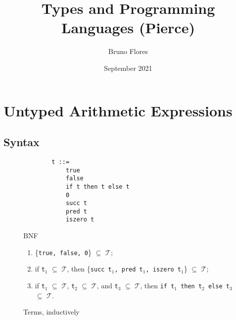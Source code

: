 \documentclass{article}
\title{Types and Programming Languages (Pierce)}
\author{Bruno Flores}
\date{September 2021}
\begin{document}
\maketitle

\section{Untyped Arithmetic Expressions}

\subsection{Syntax}

\begin{figure}[h!]
    \begin{verbatim}
        t ::=
            true
            false
            if t then t else t
            0
            succ t
            pred t
            iszero t
    \end{verbatim}
    \caption{BNF}
\end{figure}

\begin{figure}[h!]
    \begin{enumerate}
        \item \{\texttt{true, false, 0}\} \(\subseteq\) \(\mathcal{T}\);
        \item 
            if \texttt{t\(_1\)} \(\subseteq\) \(\mathcal{T}\), 
            then \{\texttt{succ t\(_1\), pred t\(_1\), iszero t\(_1\)}\} \(\subseteq\) \(\mathcal{T}\);
        \item 
            if \texttt{t\(_1\)} \(\subseteq\) \(\mathcal{T}\), \texttt{t\(_2\)} \(\subseteq\) \(\mathcal{T}\),
            and \texttt{t\(_3\)} \(\subseteq\) \(\mathcal{T}\), 
            then \texttt{if t\(_1\) then t\(_2\) else t\(_3\)} \(\subseteq\) \(\mathcal{T}\).
    \end{enumerate}
    \caption{Terms, inductively}
\end{figure}
\end{document}
